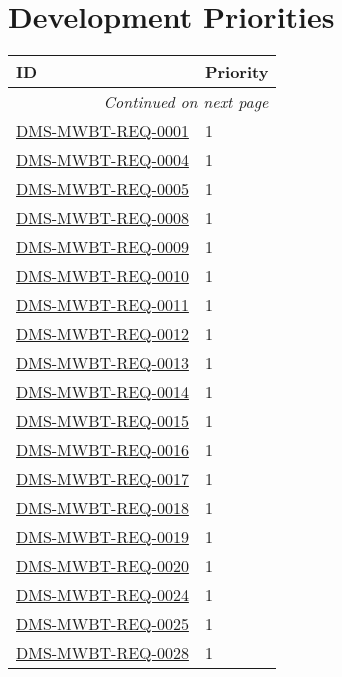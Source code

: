 \appendix

\section{Development Priorities}

\setlength\LTleft{0pt}
\setlength\LTright{\fill}
\begin{small}
\begin{longtable}[]{|l|l|}

\hline \textbf{ID} & \textbf{Priority} \\ \hline
\endhead

\hline \multicolumn{2}{r}{\emph{Continued on next page}} \\
\endfoot

\hline\hline
\endlastfoot

\hyperref[DMS-MWBT-REQ-0001]{DMS-MWBT-REQ-0001} & 1 \\
\hyperref[DMS-MWBT-REQ-0004]{DMS-MWBT-REQ-0004} & 1 \\
\hyperref[DMS-MWBT-REQ-0005]{DMS-MWBT-REQ-0005} & 1 \\
\hyperref[DMS-MWBT-REQ-0008]{DMS-MWBT-REQ-0008} & 1 \\
\hyperref[DMS-MWBT-REQ-0009]{DMS-MWBT-REQ-0009} & 1 \\
\hyperref[DMS-MWBT-REQ-0010]{DMS-MWBT-REQ-0010} & 1 \\
\hyperref[DMS-MWBT-REQ-0011]{DMS-MWBT-REQ-0011} & 1 \\
\hyperref[DMS-MWBT-REQ-0012]{DMS-MWBT-REQ-0012} & 1 \\
\hyperref[DMS-MWBT-REQ-0013]{DMS-MWBT-REQ-0013} & 1 \\
\hyperref[DMS-MWBT-REQ-0014]{DMS-MWBT-REQ-0014} & 1 \\
\hyperref[DMS-MWBT-REQ-0015]{DMS-MWBT-REQ-0015} & 1 \\
\hyperref[DMS-MWBT-REQ-0016]{DMS-MWBT-REQ-0016} & 1 \\
\hyperref[DMS-MWBT-REQ-0017]{DMS-MWBT-REQ-0017} & 1 \\
\hyperref[DMS-MWBT-REQ-0018]{DMS-MWBT-REQ-0018} & 1 \\
\hyperref[DMS-MWBT-REQ-0019]{DMS-MWBT-REQ-0019} & 1 \\
\hyperref[DMS-MWBT-REQ-0020]{DMS-MWBT-REQ-0020} & 1 \\
\hyperref[DMS-MWBT-REQ-0024]{DMS-MWBT-REQ-0024} & 1 \\
\hyperref[DMS-MWBT-REQ-0025]{DMS-MWBT-REQ-0025} & 1 \\
\hyperref[DMS-MWBT-REQ-0028]{DMS-MWBT-REQ-0028} & 1 \\

\end{longtable}
\end{small}
